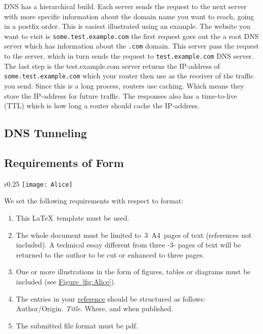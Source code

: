 \documentclass[a4paper,11pt]{article}
\begin{document}
DNS has a hierarchical build. Each server sends the request to the next server with more specific information about the domain name you want to reach, going in a postfix order. This is easiest illustrated using an example. The website you want to visit is \texttt{some.test.example.com} the first request goes out the a root DNS server which has information about the \texttt{.com} domain. This server pass the request to the  server, which in turn sends the request to \texttt{test.example.com} DNS server. The last step is the test.example.com server returns the IP-address of \texttt{some.test.example.com} which your router then use as the receiver of the traffic you send. Since this is a long process, routers use caching. Which means they store the IP-address for future traffic. The responses also has a time-to-live (TTL) which is how long a router should cache the IP-address.


\subsection{DNS Tunneling}





\subsection{Requirements of Form}

\begin{wrapfigure}[10]{r}{0.25\textwidth}
  \centering
  \texttt{[image: Alice]} %
  \vspace{-0.2cm}
  \caption{A ``wrapped'' figure with the text.}
  \label{fig:Alice}
\end{wrapfigure}

We set the following requirements with respect to format:
\begin{enumerate}
	\item This \LaTeX\ template must be used.
	\item The whole document must be limited to~3~A4~pages of text (references not included).  A technical essay different from three -3- pages of text will be returned to the author
to be cut or enhanced to three pages.
	\item One or more illustrations in the form of figures, tables or diagrams must be included (see \hyperref[fig:Alice]{Figure~\ref*{fig:Alice}}).
	\item The entries in your \hyperref[sec:references]{reference} should be structured as follows:\\
	Author/Origin. \textit{Title}. Where, and when published.
	\item The submitted file format must be pdf.
\end{enumerate}
\end{document}
